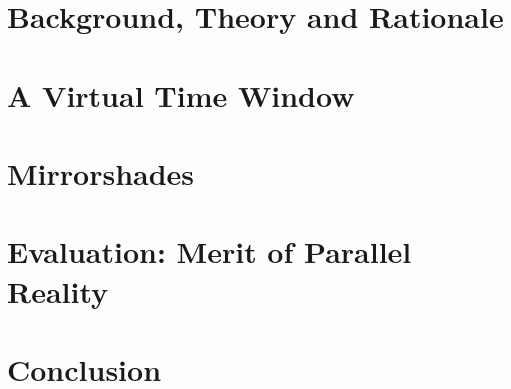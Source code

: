 \documentclass[a4paper]{report}
\begin{document}

%


\chapter{Background, Theory and Rationale}
\graphicspath{ {03_background/images/} }

%


\chapter{A Virtual Time Window}
\graphicspath{ {04_vtw/images/} }



\chapter{Mirrorshades}
\graphicspath{ {05_mirrorshades_design_implementation/images/} }



\chapter{Evaluation: Merit of Parallel Reality}
\graphicspath{ {06_mirrorshades_studies_results/images/} }



\chapter{Conclusion}
\graphicspath{ {06_mirrorshades_studies_results/images/} }

\end{document}

